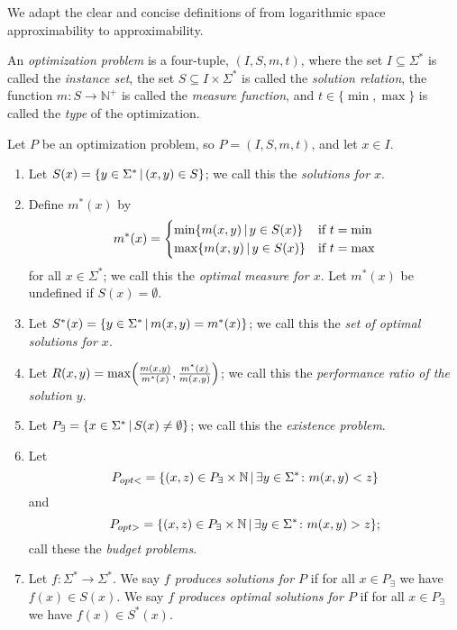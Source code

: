 \documentclass[]{article}
\newcommand{\lb}{\left\{}
\newcommand{\rb}{\right\}}
\newcommand{\st}{\,\middle|\,}
\let\originalleft\left
\let\originalright\right
\renewcommand{\left}{\mathopen{}\mathclose\bgroup\originalleft}
\renewcommand{\right}{\aftergroup\egroup\originalright}
\begin{document}
We adapt the clear and concise definitions of \cite{tantau07} from logarithmic space approximability to \NC{} approximability.

\begin{definition}
  An \emph{optimization problem} is a four-tuple, $(I, S, m, t)$, where the set $I \subseteq \Sigma^*$ is called the \emph{instance set}, the set $S \subseteq I \times \Sigma^*$ is called the \emph{solution relation}, the function $m \colon S \to \mathbb{N}^+$ is called the \emph{measure function}, and $t \in \{\min, \max\}$ is called the \emph{type} of the optimization.
\end{definition}

\begin{definition}
  Let $P$ be an optimization problem, so $P = (I, S, m, t)$, and let $x\in I$.
  \begin{enumerate}
  \item Let $S(x)=\lb y\in\Sigma^* \st (x, y)\in S \rb$; we call this the \emph{solutions for $x$}.
  \item Define $m^*(x)$ by
    \begin{displaymath}
      m^*(x) =
      \begin{cases}
        \min \lb m(x, y) \st y\in S(x) \rb & \text{if } t = \min \\
        \max \lb m(x, y) \st y\in S(x) \rb & \text{if } t = \max
      \end{cases}
    \end{displaymath}
    for all $x\in \Sigma^*$; we call this the \emph{optimal measure for $x$}.
    Let $m^*(x)$ be undefined if $S(x)=\emptyset$.
  \item Let $S^*(x)=\lb y\in\Sigma^* \st m(x, y) = m^*(x) \rb$; we call this the \emph{set of optimal solutions for $x$}.
  \item Let $R(x, y)=\max\left( \frac{m(x, y)}{m^*(x)}, \frac{m^*(x)}{m(x, y)} \right)$; we call this the \emph{performance ratio of the solution $y$}.
  \item Let $P_\exists = \lb x\in \Sigma^* \st S(x) \neq \emptyset \rb$; we call this the \emph{existence problem}.
  \item Let
    \begin{displaymath}
      P_{opt<}=\lb (x, z) \in P_\exists\times\mathbb{N} \st \exists y\in\Sigma^*\colon m(x, y) < z \rb
    \end{displaymath}
    and
    \begin{displaymath}
      P_{opt>}=\lb (x, z) \in P_\exists\times\mathbb{N} \st \exists y\in\Sigma^*\colon m(x, y) > z \rb;
    \end{displaymath}
    call these the \emph{budget problems}.
  \item Let $f\colon \Sigma^*\to\Sigma^*$.
    We say \emph{$f$ produces solutions for $P$} if for all $x\in P_\exists$ we have $f(x)\in S(x)$.
    We say \emph{$f$ produces optimal solutions for $P$} if for all $x\in P_\exists$ we have $f(x)\in S^*(x)$.
  \end{enumerate}
\end{definition}
\end{document}
